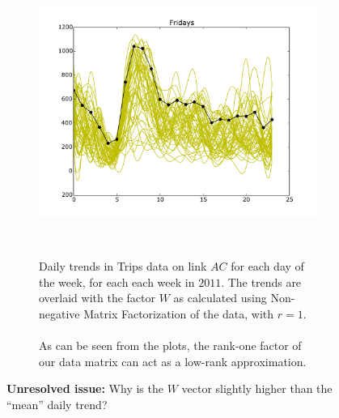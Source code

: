 \documentclass[10pt,a4paper]{amsart}
\begin{document}
\begin{figure}[h!]
    \begin{subfigure}[b]{0.5\textwidth}
        \includegraphics[width=\textwidth]
        		{Figures/Daily_trends_AC_Friday.pdf}
    \end{subfigure}
    ~
    \begin{subfigure}[b]{0.5\textwidth}
        Daily trends in Trips data on link \(AC\) for each day of the
        week, for each each week in \(2011\). The trends are overlaid
        with the factor \(W\) as calculated using Non-negative Matrix
        Factorization of the data, with \(r=1\).
        \\\\
        As can be seen from the plots, the rank-one factor of our data
        matrix can act as a low-rank approximation.
        \\
	\end{subfigure}
        \textbf{Unresolved issue:} Why is the \(W\) vector slightly
        higher than the ``mean'' daily trend?
\end{figure}
\vspace*{2cm}
\end{document}
